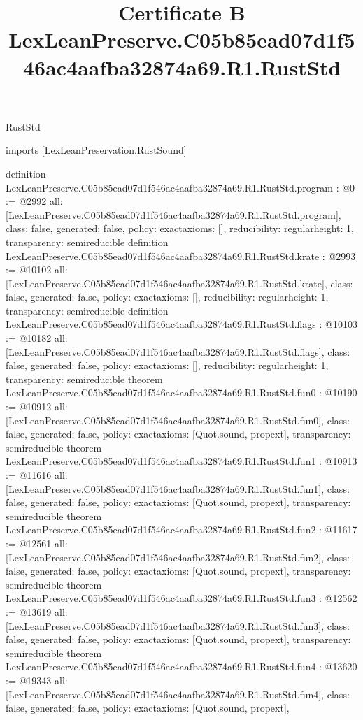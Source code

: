 \begin{lexlean}{RustStd}
\title{Certificate B LexLeanPreserve.C05b85ead07d1f546ac4aafba32874a69.R1.RustStd}
\begin{coremodule}
imports [LexLeanPreservation.RustSound]

definition LexLeanPreserve.C05b85ead07d1f546ac4aafba32874a69.R1.RustStd.program : @0 := @2992 {
  all: [LexLeanPreserve.C05b85ead07d1f546ac4aafba32874a69.R1.RustStd.program],
  class: false,
  generated: false,
  policy: exact{axioms: []},
  reducibility: regular{height: 1},
  transparency: semireducible
}
definition LexLeanPreserve.C05b85ead07d1f546ac4aafba32874a69.R1.RustStd.krate : @2993 := @10102 {
  all: [LexLeanPreserve.C05b85ead07d1f546ac4aafba32874a69.R1.RustStd.krate],
  class: false,
  generated: false,
  policy: exact{axioms: []},
  reducibility: regular{height: 1},
  transparency: semireducible
}
definition LexLeanPreserve.C05b85ead07d1f546ac4aafba32874a69.R1.RustStd.flags : @10103 := @10182 {
  all: [LexLeanPreserve.C05b85ead07d1f546ac4aafba32874a69.R1.RustStd.flags],
  class: false,
  generated: false,
  policy: exact{axioms: []},
  reducibility: regular{height: 1},
  transparency: semireducible
}
theorem LexLeanPreserve.C05b85ead07d1f546ac4aafba32874a69.R1.RustStd.fun0 : @10190 := @10912 {
  all: [LexLeanPreserve.C05b85ead07d1f546ac4aafba32874a69.R1.RustStd.fun0],
  class: false,
  generated: false,
  policy: exact{axioms: [Quot.sound, propext]},
  transparency: semireducible
}
theorem LexLeanPreserve.C05b85ead07d1f546ac4aafba32874a69.R1.RustStd.fun1 : @10913 := @11616 {
  all: [LexLeanPreserve.C05b85ead07d1f546ac4aafba32874a69.R1.RustStd.fun1],
  class: false,
  generated: false,
  policy: exact{axioms: [Quot.sound, propext]},
  transparency: semireducible
}
theorem LexLeanPreserve.C05b85ead07d1f546ac4aafba32874a69.R1.RustStd.fun2 : @11617 := @12561 {
  all: [LexLeanPreserve.C05b85ead07d1f546ac4aafba32874a69.R1.RustStd.fun2],
  class: false,
  generated: false,
  policy: exact{axioms: [Quot.sound, propext]},
  transparency: semireducible
}
theorem LexLeanPreserve.C05b85ead07d1f546ac4aafba32874a69.R1.RustStd.fun3 : @12562 := @13619 {
  all: [LexLeanPreserve.C05b85ead07d1f546ac4aafba32874a69.R1.RustStd.fun3],
  class: false,
  generated: false,
  policy: exact{axioms: [Quot.sound, propext]},
  transparency: semireducible
}
theorem LexLeanPreserve.C05b85ead07d1f546ac4aafba32874a69.R1.RustStd.fun4 : @13620 := @19343 {
  all: [LexLeanPreserve.C05b85ead07d1f546ac4aafba32874a69.R1.RustStd.fun4],
  class: false,
  generated: false,
  policy: exact{axioms: [Quot.sound, propext]},
}
\end{coremodule}
\end{lexlean}
